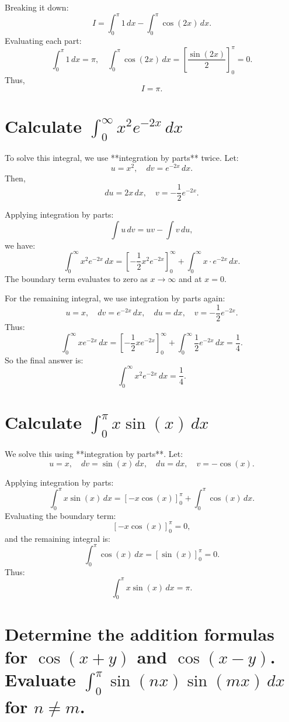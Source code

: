 \documentclass[a4paper,12pt]{article}
\begin{document}
\begin{multicols}{2}
Breaking it down:
\[
I = \int_0^{\pi} 1 \, dx - \int_0^{\pi} \cos(2x) \, dx.
\]
Evaluating each part:
\[
\int_0^{\pi} 1 \, dx = \pi, \quad \int_0^{\pi} \cos(2x) \, dx = \left[ \frac{\sin(2x)}{2} \right]_0^{\pi} = 0.
\]
Thus,
\[
I = \pi. \tag{L1}
\]

\section*{Calculate $\int_0^{\infty} x^2 e^{-2x} \, dx$}

To solve this integral, we use **integration by parts** twice. Let:
\[
u = x^2, \quad dv = e^{-2x} \, dx.
\]
Then,
\[
 du = 2x \, dx, \quad v = -\frac{1}{2} e^{-2x}.
\]

Applying integration by parts:
\[
\int u \, dv = uv - \int v \, du,
\]
we have:
\[
\int_0^{\infty} x^2 e^{-2x} \, dx = \left[ -\frac{1}{2} x^2 e^{-2x} \right]_0^{\infty} + \int_0^{\infty} x \cdot e^{-2x} \, dx.
\]
The boundary term evaluates to zero as \(x \to \infty\) and at \(x = 0\).

For the remaining integral, we use integration by parts again:
\[
u = x, \quad dv = e^{-2x} \, dx, \quad du = dx, \quad v = -\frac{1}{2} e^{-2x}.
\]
Thus:
\[
\int_0^{\infty} x e^{-2x} \, dx = \left[ -\frac{1}{2} x e^{-2x} \right]_0^{\infty} + \int_0^{\infty} \frac{1}{2} e^{-2x} \, dx = \frac{1}{4}.
\]
So the final answer is:
\[
\int_0^{\infty} x^2 e^{-2x} \, dx = \frac{1}{4}. \tag{L2}
\]

\section*{Calculate $\int_0^{\pi} x \sin(x) \, dx$}

We solve this using **integration by parts**. Let:
\[
u = x, \quad dv = \sin(x) \, dx, \quad du = dx, \quad v = -\cos(x).
\]

Applying integration by parts:
\[
\int_0^{\pi} x \sin(x) \, dx = \left[ -x \cos(x) \right]_0^{\pi} + \int_0^{\pi} \cos(x) \, dx.
\]
Evaluating the boundary term:
\[
\left[ -x \cos(x) \right]_0^{\pi} = 0,
\]
and the remaining integral is:
\[
\int_0^{\pi} \cos(x) \, dx = \left[ \sin(x) \right]_0^{\pi} = 0.
\]
Thus:
\[
\int_0^{\pi} x \sin(x) \, dx = \pi. \tag{L3}
\]

\section*{Determine the addition formulas for $\cos(x+y)$ and $\cos(x-y)$. Evaluate $\int_0^{\pi} \sin(nx) \sin(mx) \, dx$ for $n \neq m$.}


\end{multicols}
\end{document}

